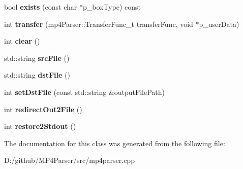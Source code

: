\begin{DoxyCompactItemize}
bool {\bfseries exists} (const char $\ast$p\+\_\+box\+Type) const
\item 
\mbox{\label{classmp4_parser_1_1_m_p4_parser_impl_a9359a3a2a21fdea17f0bf023d5111ad8}} 
int {\bfseries transfer} (mp4\+Parser\+::\+Transfer\+Func\+\_\+t transfer\+Func, void $\ast$p\+\_\+user\+Data)
\item 
\mbox{\label{classmp4_parser_1_1_m_p4_parser_impl_a7f4ff13eb8e07843580b4dc205fe53e5}} 
int {\bfseries clear} ()
\item 
\mbox{\label{classmp4_parser_1_1_m_p4_parser_impl_a14893e3ea92dfcfe5b5357a898d888f3}} 
std\+::string {\bfseries src\+File} ()
\item 
\mbox{\label{classmp4_parser_1_1_m_p4_parser_impl_a4e503fd395c8d7cd46c605e4a4b23584}} 
std\+::string {\bfseries dst\+File} ()
\item 
\mbox{\label{classmp4_parser_1_1_m_p4_parser_impl_a3840df626f2163013bf0e94c7aac2f14}} 
int {\bfseries set\+Dst\+File} (const std\+::string \&output\+File\+Path)
\item 
\mbox{\label{classmp4_parser_1_1_m_p4_parser_impl_a45c57a93171667ba2361ef95292d5b9b}} 
int {\bfseries redirect\+Out2\+File} ()
\item 
\mbox{\label{classmp4_parser_1_1_m_p4_parser_impl_aeed8ee718587393e3fc730cbe0f60ce7}} 
int {\bfseries restore2\+Stdout} ()
\end{DoxyCompactItemize}


The documentation for this class was generated from the following file\+:\begin{DoxyCompactItemize}
\item 
D\+:/github/\+M\+P4\+Parser/src/mp4parser.\+cpp\end{DoxyCompactItemize}
